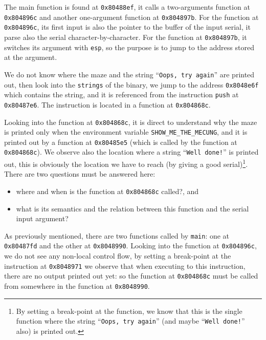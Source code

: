 \documentclass{easychair}
\begin{document}
The main function is found at \texttt{0x80488ef}, it calls a two-arguments function at \texttt{0x804896c} and another one-argument function at \texttt{0x804897b}. For the function at \texttt{0x804896c}, its first input is also the pointer to the buffer of the input serial, it parse also the serial character-by-character. For the function at \texttt{0x804897b}, it switches its argument with \texttt{esp}, so the purpose is to jump to the address stored at the argument.

We do not know where the maze and the string ``\texttt{Oops, try again}'' are printed out, then look into the \texttt{strings} of the binary, we jump to the address \texttt{0x8048e6f} which contains the string, and it is referenced from the instruction \texttt{push} at \texttt{0x80487e6}. The instruction is located in a function at \texttt{0x804868c}.

Looking into the function at \texttt{0x804868c}, it is direct to understand why the maze is printed only when the environment variable \texttt{SHOW\_ME\_THE\_MECUNG}, and it is printed out by a function at \texttt{0x80485e5} (which is called by the function at \texttt{0x804868c}). We observe also the location where a string ``\texttt{Well done!}'' is printed out, this is obviously the location we have to reach (by giving a good serial)\footnote{By setting a break-point at the function, we know that this is the single function where the string ``\texttt{Oops, try again}'' (and maybe ``\texttt{Well done!}'' also) is printed out.}. There are two questions must be answered here:
\begin{itemize}
\item where and when is the function at \texttt{0x804868c} called?, and
\item what is its semantics and the relation between this function and the serial input argument?
\end{itemize}


As previously mentioned, there are two functions called by \texttt{main}: one at \texttt{0x80487fd} and the other at \texttt{0x8048990}. Looking into the function at \texttt{0x804896c}, we do not see any non-local control flow, by setting a break-point at the instruction at \texttt{0x8048971} we observe that when executing to this instruction, there are no output printed out yet: so the function at \texttt{0x804868c} must be called from somewhere in the function at \texttt{0x8048990}.
\end{document}
